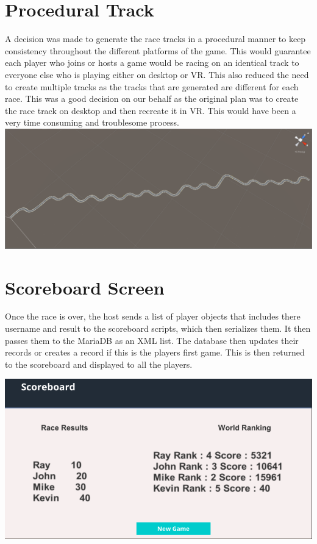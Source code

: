 \section{Procedural Track}
A decision was made to generate the race tracks in a procedural manner to keep consistency throughout the different platforms of the game. This would guarantee each player who joins or hosts a game would be racing on an identical track to everyone else who is playing either on desktop or VR. This also reduced the need to create multiple tracks as the tracks that are generated are different for each race. This was a good decision on our behalf as the original plan was to create the race track on desktop and then recreate it in VR. This would have been a very time consuming and troublesome process. 
\includegraphics[width=1\columnwidth]{img/ProceduralTrack1.PNG}


\section{Scoreboard Screen}

Once the race is over, the host sends a list of player objects that includes there username and result to the scoreboard scripts, which then serializes them. It then passes them to the MariaDB as an XML list. The database then updates their  records or creates a record if this is the players first game. This is then returned to the scoreboard and displayed to all the players.
\newline 

\includegraphics[width=1\columnwidth]{img/results.PNG}